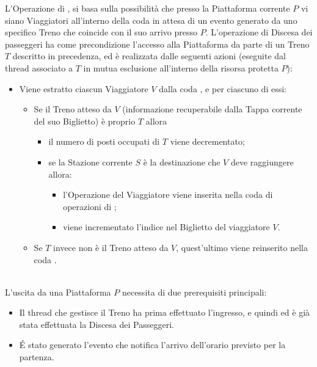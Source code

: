 \begin{description}
		L'Operazione di , si basa sulla possibilità che presso la Piattaforma corrente $P$ vi siano Viaggiatori all'interno della coda  in attesa di un evento generato da uno specifico Treno che coincide con il suo arrivo presso $P$. L'operazione di Discesa dei passeggeri ha come precondizione l'accesso alla Piattaforma da parte di un Treno $T$ descritto in precedenza, ed è realizzata dalle seguenti azioni (eseguite dal thread associato a $T$ in mutua esclusione all'interno della risorsa protetta $P$):
		\begin{itemize}
			\item Viene estratto ciascun Viaggiatore $V$ dalla coda , e per ciascuno di essi:
			\begin{itemize}
				\item Se il Treno atteso da $V$ (informazione recuperabile dalla Tappa corrente del suo Biglietto) è proprio $T$ allora
					\begin{itemize}
						\item il numero di posti occupati di $T$ viene decrementato;
						\item se la Stazione corrente $S$  è la destinazione che $V$ deve raggiungere allora:
							\begin{itemize}
								\item l'Operazione  del Viaggiatore viene inserita nella coda di operazioni di ;
								\item viene incrementato l'indice  nel Biglietto del viaggiatore $V$.
							\end{itemize}
					\end{itemize}
				\item Se $T$ invece non è il Treno atteso da $V$, quest'ultimo viene reinserito nella coda .
			\end {itemize}
		\end{itemize}
	
	\item{}\\
		
		L'uscita da una Piattaforma $P$ necessita di due prerequisiti principali:
		
			\begin{itemize}
				\item Il thread che gestisce il Treno ha prima effettuato l'ingresso, e quindi  ed è già stata effettuata la Discesa dei Passeggeri.
				\item \'E stato generato l'evento che notifica l'arrivo dell'orario previsto per la partenza.
			\end{itemize}
		

\end{description}
